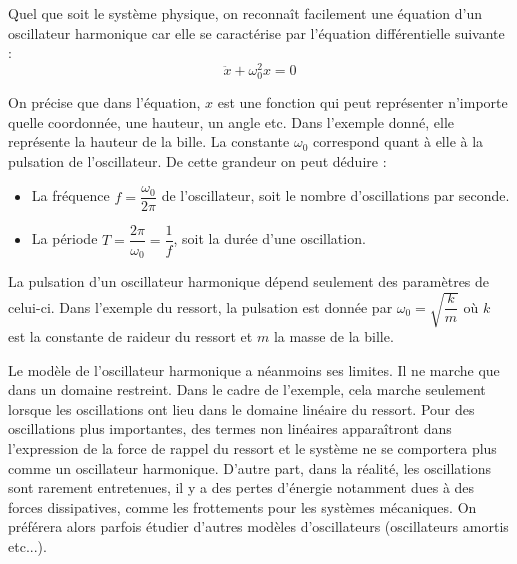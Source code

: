 \documentclass{article}
\begin{document}

\noindent Quel que soit le système physique, on reconnaît facilement une équation d'un oscillateur harmonique car elle se caractérise par l'équation différentielle suivante :
\begin{equation*}
    \ddot x + \omega_0^2x =  0
\end{equation*}

\noindent On précise que dans l'équation, $x$ est une fonction qui peut représenter n'importe quelle coordonnée, une hauteur, un angle etc. Dans l'exemple donné, elle représente la hauteur de la bille.
La constante $\omega_0$ correspond quant à elle à la pulsation de l'oscillateur. De cette grandeur on peut déduire :
\begin{itemize}
    \item La fréquence $f = \dfrac{\omega_0}{2\pi}$ de l'oscillateur, soit le nombre d'oscillations par seconde.
    \item La période $T = \dfrac{2\pi}{\omega_0} = \dfrac{1}{f}$, soit la durée d'une oscillation.
\end{itemize}
\noindent La pulsation d'un oscillateur harmonique dépend seulement des paramètres de celui-ci. Dans l'exemple du ressort, la pulsation est donnée par $\omega_0 = \sqrt{\dfrac{k}{m}}$ où $k$ est la constante de raideur du ressort et $m$ la masse de la bille.

\noindent Le modèle de l'oscillateur harmonique a néanmoins ses limites. Il ne marche que dans un domaine restreint. Dans le cadre de l'exemple, cela marche seulement lorsque les oscillations ont lieu dans le domaine linéaire du ressort. Pour des oscillations plus importantes, des termes non linéaires apparaîtront dans l'expression de la force de rappel du ressort et le système ne se comportera plus comme un oscillateur harmonique. D'autre part, dans la réalité, les oscillations sont rarement entretenues, il y a des pertes d'énergie notamment dues à des forces dissipatives, comme les frottements pour les systèmes mécaniques. On préférera alors parfois étudier d'autres modèles d'oscillateurs (oscillateurs amortis etc...). \\
\end{document}
